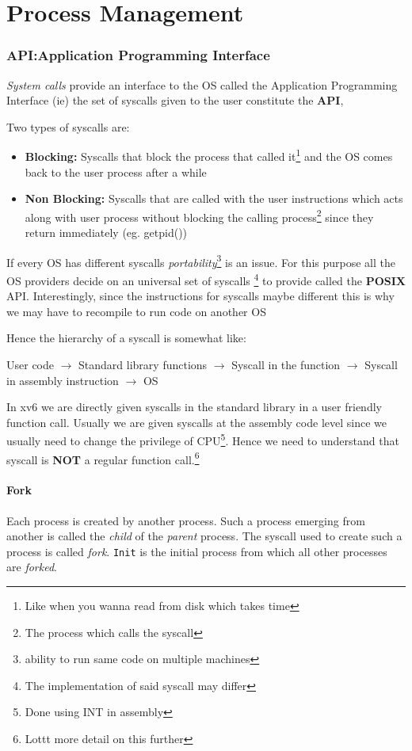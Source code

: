 \documentclass[12pt]{article}
\begin{document}
\part{Process Management}
\section{API:Application Programming Interface}
\textit{System calls} provide an interface to the OS called the Application Programming Interface (ie) the set of syscalls given
to the user constitute the \textbf{API},

Two types of syscalls are:
\begin{itemize}[topsep=0pt, partopsep=0pt, itemsep=0pt, parsep=0pt]
    \item \textbf{Blocking:} Syscalls that block the process that called it\footnote{Like when you wanna read from disk which takes time} and the OS comes back to the user process after a while
    \item \textbf{Non Blocking:} Syscalls that are called with the user instructions which acts along with user process without blocking the calling process\footnote{The process which calls the syscall} since they return immediately (eg. getpid())
\end{itemize}


If every OS has different syscalls \textit{portability}\footnote{ability to run same code on multiple machines} is an issue. For this purpose all the OS providers decide on an universal set of syscalls
\footnote{The implementation of said syscall may differ} to provide called the \textbf{POSIX} API. Interestingly, since the instructions for syscalls maybe different this is why we may have to recompile to run code on another OS

Hence the hierarchy of a syscall is somewhat like:
\begin{center}
    User code $\rightarrow$ Standard library functions $\rightarrow$ Syscall in the function $\rightarrow$ Syscall in assembly instruction $\rightarrow$ OS
\end{center}

In xv6 we are directly given syscalls in the standard library in a user friendly function call. Usually we are given syscalls at the assembly code level
since we usually need to change the privilege of CPU\footnote{Done using INT in assembly}. Hence we need to understand that syscall is \textbf{NOT} a regular function call.\footnote{Lottt more detail on this further}

\subsection{Fork}
Each process is created by another process. Such a process emerging from another is called the \textit{child} of the \textit{parent} process.
The syscall used to create such a process is called \textit{fork}. \texttt{Init} is the initial process from which all other processes are \textit{forked}.
\end{document}
